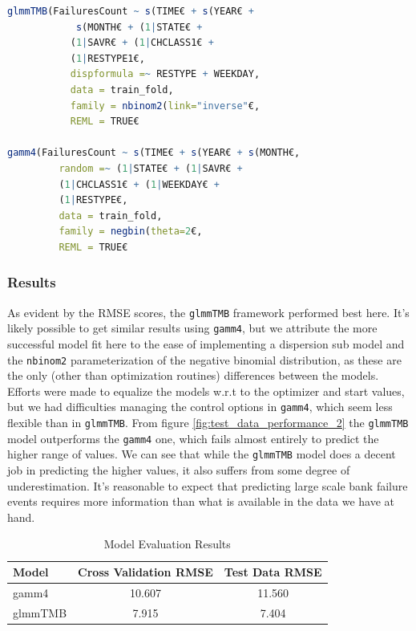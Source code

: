 \documentclass[12pt, twoside,hidelinks]{article}
\theoremstyle{definition}
\numberwithin{equation}{section}
\begin{document}
\begin{lstlisting}[language=R]
glmmTMB(FailuresCount ~ s(TIME€ + s(YEAR€ + 
            s(MONTH€ + (1|STATE€ + 
           (1|SAVR€ + (1|CHCLASS1€ + 
           (1|RESTYPE1€,
           dispformula =~ RESTYPE + WEEKDAY,
           data = train_fold, 
           family = nbinom2(link="inverse"€,
           REML = TRUE€

gamm4(FailuresCount ~ s(TIME€ + s(YEAR€ + s(MONTH€, 
         random =~ (1|STATE€ + (1|SAVR€ + 
         (1|CHCLASS1€ + (1|WEEKDAY€ + 
         (1|RESTYPE€,
         data = train_fold, 
         family = negbin(theta=2€,
         REML = TRUE€
\end{lstlisting}

\subsubsection{Results}

As evident by the RMSE scores, the \texttt{glmmTMB} framework performed best here. It's likely possible to get similar results using \texttt{gamm4}, but we attribute the more successful model fit here to the ease of implementing a dispersion sub model and the \texttt{nbinom2} parameterization of the negative binomial distribution, as these are the only (other than optimization routines) differences between the models. Efforts were made to equalize the models w.r.t to the optimizer and start values, but we had difficulties managing the control options in \texttt{gamm4}, which seem less flexible than in \texttt{glmmTMB}. 
From figure \ref{fig:test_data_performance_2} the \texttt{glmmTMB} model outperforms the \texttt{gamm4} one, which fails almost entirely to predict the higher range of values. We can see that
while the \texttt{glmmTMB} model does a decent job in predicting the higher values, it also suffers from some degree of underestimation. It's reasonable to expect that predicting large scale bank failure events requires more information than what is available in the data we have at hand. 

\begin{table}[H]
\centering
\caption{Model Evaluation Results}
\label{table:model_evaluation}
\begin{tabular}{lcc}
\hline
\textbf{Model} & \textbf{Cross Validation RMSE} & \textbf{Test Data RMSE} \\
\hline
gamm4 & 10.607 & 11.560 \\
glmmTMB & 7.915 & 7.404 \\
\hline
\end{tabular}
\end{table}
\end{document}
